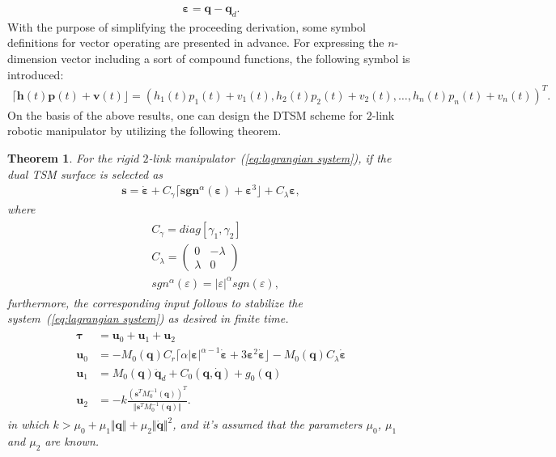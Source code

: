 \documentclass[3p]{elsarticle}
\theoremstyle{plain}
\newtheorem{mythm}{Theorem}
\theoremstyle{remark}
\begin{document}
\begin{align}
\bm \varepsilon = \bm q -\bm q_d.
\end{align}
With the purpose of simplifying the proceeding derivation, some symbol definitions for vector operating are presented in advance. For expressing the $n$-dimension vector including a sort of compound functions, the following symbol is introduced:
\begin{align*}
\lceil\bm h(t)\bm p(t)+\bm v(t)\rfloor = (h_1(t)p_1(t)+v_1(t),h_2(t)p_2(t)+v_2(t),\ldots,h_n(t)p_n(t)+v_n(t))^T.
\end{align*}
On the basis of the above results, one can design the DTSM scheme for $2$-link robotic manipulator by utilizing the following theorem.
\begin{mythm}\label{theorem:4}
For the rigid $2$-link manipulator~(\ref{eq:lagrangian system}), if the dual TSM surface is selected as
\begin{align}
\bm s = \dot{\bm \varepsilon}+C_\gamma\lceil\bm{sgn}^\alpha(\bm \varepsilon)+\bm\varepsilon^3\rfloor+C_\lambda{\bm\varepsilon},\label{eq:lagrangian surface}
\end{align}
where
\begin{align}
\begin{split}
&C_\gamma=diag[\gamma_1,\gamma_2]\\
&C_\lambda=
\begin{pmatrix}
0 &-\lambda\\ \lambda &0
\end{pmatrix}\\
&{sgn}^\alpha(\varepsilon)=\vert\varepsilon\vert^\alpha sgn(\varepsilon),
\end{split}
\end{align}
furthermore, the corresponding input follows to stabilize the system~(\ref{eq:lagrangian system}) as desired in finite time.
\begin{align}
\begin{split}
\bm\tau &= \bm u_0+\bm u_1 +\bm u_2\\
\bm u_0 &= -M_0(\bm q)C_r\lceil\alpha\vert\bm\varepsilon\vert^{\alpha-1}\dot{\bm \varepsilon}+3\bm \varepsilon^2\dot{\bm \varepsilon}\rfloor-M_0(\bm q)C_\lambda\dot{\bm \varepsilon}\\
\bm u_1 &= M_0(\bm q)\ddot {\bm q}_d+C_0(\bm q,\dot {\bm q})+g_0(\bm q)\\
\bm u_2 &= -k\frac{(\bm s^TM_0^{-1}(\bm q))^T}{\Vert\bm s^TM_0^{-1}(\bm q)\Vert}.
\end{split}
\end{align}
in which $k>\mu_0+\mu_1\Vert\bm q\Vert+\mu_2\Vert\dot{\bm q}\Vert^2$, and it's assumed that the parameters $\mu_0$, $\mu_1$ and $\mu_2$ are known.
\end{mythm}
\end{document}

